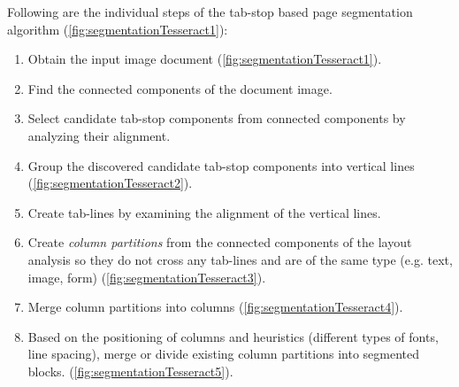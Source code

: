 Following are the individual steps of the tab-stop based page segmentation algorithm (\cref{fig:segmentationTesseract1}):
\begin{enumerate}
    \item Obtain the input image document (\cref{fig:segmentationTesseract1}).
    \item Find the connected components of the document image.
    \item Select candidate tab-stop components from connected components by analyzing their alignment.
    \item Group the discovered candidate tab-stop components into vertical lines (\cref{fig:segmentationTesseract2}).
    \item Create tab-lines by examining the alignment of the vertical lines.
    \item Create \emph{column partitions} from the connected components of the layout analysis so they do not cross any tab-lines and are of the same type (e.g. text, image, form) (\cref{fig:segmentationTesseract3}).
    \item Merge column partitions into columns (\cref{fig:segmentationTesseract4}).
    \item Based on the positioning of columns and heuristics (different types of fonts, line spacing), merge or divide existing column partitions into segmented blocks. (\cref{fig:segmentationTesseract5}).
\end{enumerate}

